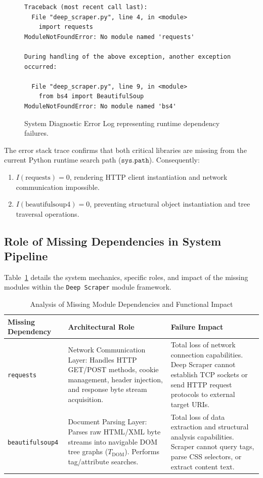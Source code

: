 \documentclass{article}
\begin{document}
\begin{figure}[h!]
\centering
\begin{small}
\begin{verbatim}
Traceback (most recent call last):
  File "deep_scraper.py", line 4, in <module>
    import requests
ModuleNotFoundError: No module named 'requests'

During handling of the above exception, another exception occurred:

  File "deep_scraper.py", line 9, in <module>
    from bs4 import BeautifulSoup
ModuleNotFoundError: No module named 'bs4'
\end{verbatim}
\end{small}
\caption{System Diagnostic Error Log representing runtime dependency failures.}
\label{fig:error_log}
\end{figure}

The error stack trace confirms that both critical libraries are missing from the current Python runtime search path ($\texttt{sys.path}$). Consequently:
\begin{enumerate}
    \item $I(\text{requests}) = 0$, rendering HTTP client instantiation and network communication impossible.
    \item $I(\text{beautifulsoup4}) = 0$, preventing structural object instantiation and tree traversal operations.
\end{enumerate}

\subsection{Role of Missing Dependencies in System Pipeline}

Table~\ref{tab:dependency_analysis} details the system mechanics, specific roles, and impact of the missing modules within the \texttt{Deep Scraper} module framework.

\begin{table}[h!]
\centering
\caption{Analysis of Missing Module Dependencies and Functional Impact}
\label{tab:dependency_analysis}
\begin{tabular}{p{3.5cm} p{5.5cm} p{5.5cm}}
\toprule
\textbf{Missing Dependency} & \textbf{Architectural Role} & \textbf{Failure Impact} \\
\midrule
\texttt{requests} & Network Communication Layer: Handles HTTP GET/POST methods, cookie management, header injection, and response byte stream acquisition. & Total loss of network connection capabilities. Deep Scraper cannot establish TCP sockets or send HTTP request protocols to external target URIs. \\
\addlinespace
\texttt{beautifulsoup4} & Document Parsing Layer: Parses raw HTML/XML byte streams into navigable DOM tree graphs ($T_{\text{DOM}}$). Performs tag/attribute searches. & Total loss of data extraction and structural analysis capabilities. Scraper cannot query tags, parse CSS selectors, or extract content text. \\
\bottomrule
\end{tabular}
\end{table}
\end{document}
